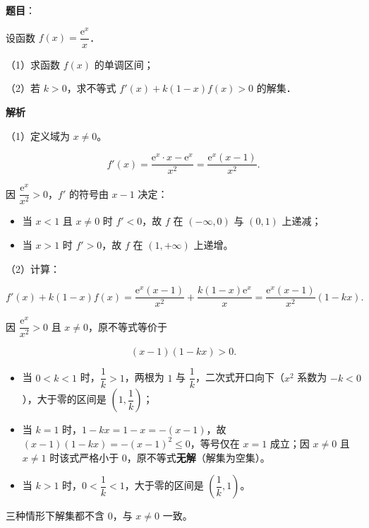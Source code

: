 \begin{answer}

\textbf{题目}：

设函数 $f(x)=\dfrac{\mathrm e^x}{x}$．

（1）求函数 $f(x)$ 的单调区间；

（2）若 $k>0$，求不等式 $f'(x)+k(1-x)f(x)>0$ 的解集．

\textbf{解析}

（1）定义域为 $x\neq0$。

\nopagebreak[4]
\[f'(x)=\frac{\mathrm e^x\cdot x-\mathrm e^x}{x^2}=\frac{\mathrm e^x(x-1)}{x^2}.\]

因 $\dfrac{\mathrm e^x}{x^2}>0$，$f'$ 的符号由 $x-1$ 决定：

\begin{itemize}
\item 当 $x<1$ 且 $x\neq0$ 时 $f'<0$，故 $f$ 在 $(-\infty,0)$ 与 $(0,1)$ 上递减；
\item 当 $x>1$ 时 $f'>0$，故 $f$ 在 $(1,+\infty)$ 上递增。
\end{itemize}

（2）计算：

\nopagebreak[4]
\[f'(x)+k(1-x)f(x)=\frac{\mathrm e^x(x-1)}{x^2}+\frac{k(1-x)\mathrm e^x}{x}=\frac{\mathrm e^x(x-1)}{x^2}\left(1-kx\right).\]

因 $\dfrac{\mathrm e^x}{x^2}>0$ 且 $x\neq0$，原不等式等价于

\nopagebreak[4]
\[(x-1)(1-kx)>0.\]

\begin{itemize}
\item 当 $0<k<1$ 时，$\dfrac1k>1$，两根为 $1$ 与 $\dfrac1k$，二次式开口向下（$x^2$ 系数为 $-k<0$），大于零的区间是 $\left(1,\dfrac1k\right)$；
\item 当 $k=1$ 时，$1-kx=1-x=-(x-1)$，故 $(x-1)(1-kx)=-(x-1)^2\leqslant0$，等号仅在 $x=1$ 成立；因 $x\neq0$ 且 $x\neq1$ 时该式严格小于 $0$，原不等式\textbf{无解}（解集为空集）。
\item 当 $k>1$ 时，$0<\dfrac1k<1$，大于零的区间是 $\left(\dfrac1k,1\right)$。
\end{itemize}

三种情形下解集都不含 $0$，与 $x\neq0$ 一致。


\end{answer}
